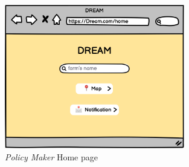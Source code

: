 \begin{figure}[H]
    \begin{center}
    \includegraphics[width=0.7\textwidth]{mockups/PMHome.png}
    \caption{\emph{Policy Maker} Home page}
    \label{fig:PMhomepage}
    \end{center}
\end{figure}

